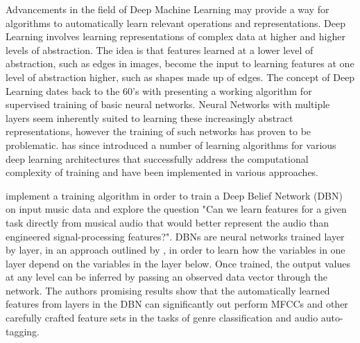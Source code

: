 \documentclass[12pt]{article}
\begin{document}
Advancements in the field of Deep Machine Learning may provide a way for algorithms to automatically learn relevant operations and representations. Deep Learning involves learning representations of complex data at higher and higher levels of abstraction. The idea is that features learned at a lower level of abstraction, such as edges in images, become the input to learning features at one level of abstraction higher, such as shapes made up of edges. The concept of Deep Learning dates back to the 60's with \citet{ivakhnenko1965cybernetic} presenting a working algorithm for supervised training of basic neural networks. Neural Networks with multiple layers seem inherently suited to learning these increasingly abstract representations, however the training of such networks has proven to be problematic. \citet{bengio2009learning} has since introduced a number of learning algorithms for various deep learning architectures that successfully address the computational complexity of training and have been implemented in various approaches.

\citet{Hamel2010LearningFeatures} implement a training algorithm in order to train a Deep Belief Network (DBN) on input music data and explore the question "Can we learn features for a given task directly from musical audio that would better represent the audio than engineered signal-processing features?". DBNs are neural networks trained layer by layer, in an approach outlined by \citet{hinton2006fast}, in order to learn how the variables in one layer depend on the variables in the layer below. Once trained, the output values at any level can be inferred by passing an observed data vector through the network. The authors promising results show that the automatically learned features from layers in the DBN can significantly out perform MFCCs and other carefully crafted feature sets in the tasks of genre classification and audio auto-tagging.
\end{document}
